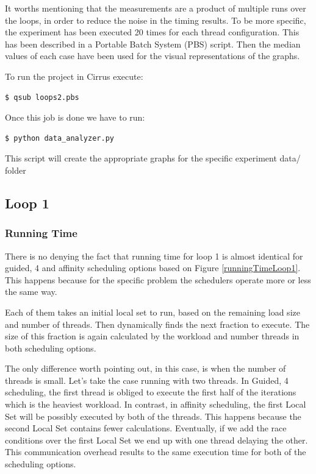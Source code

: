 \documentclass[12pt,a4paper]{article}
\begin{document}
It worths mentioning that the measurements are a product of multiple runs over the loops, in order to reduce the noise in the timing results. To be more specific, the experiment has been executed 20 times for each thread configuration. This has been described in a Portable Batch System (PBS) script. Then the median values of each case have been used for the visual representations of the graphs.

To run the project in Cirrus execute:
\begin{lstlisting}[language=bash]
  $ qsub loops2.pbs
\end{lstlisting}

Once this job is done we have to run:
\begin{lstlisting}[language=bash]
  $ python data_analyzer.py
\end{lstlisting}
This script will create the appropriate graphs for the specific experiment data/ folder

\subsection{Loop 1}

\subsubsection{Running Time}

There is no denying the fact that running time for loop 1 is almost identical for guided, 4 and affinity scheduling options based on Figure \ref{runningTimeLoop1}. This happens because for the specific problem the schedulers operate more or less the same way.

Each of them takes an initial local set to run, based on the remaining load size and number of threads. Then dynamically finds the next fraction to execute. The size of this fraction is again calculated by the workload and number threads in both scheduling options.

The only difference worth pointing out, in this case, is when the number of threads is small. Let's take the case running with two threads. In Guided, 4 scheduling, the first thread is obliged to execute the first half of the iterations which is the heaviest workload. In contrast, in affinity scheduling, the first Local Set will be possibly executed by both of the threads. This happens because the second Local Set contains fewer calculations. Eventually, if we add the race conditions over the first Local Set we end up with one thread delaying the other. This communication overhead results to the same execution time for both of the scheduling options.
\end{document}
